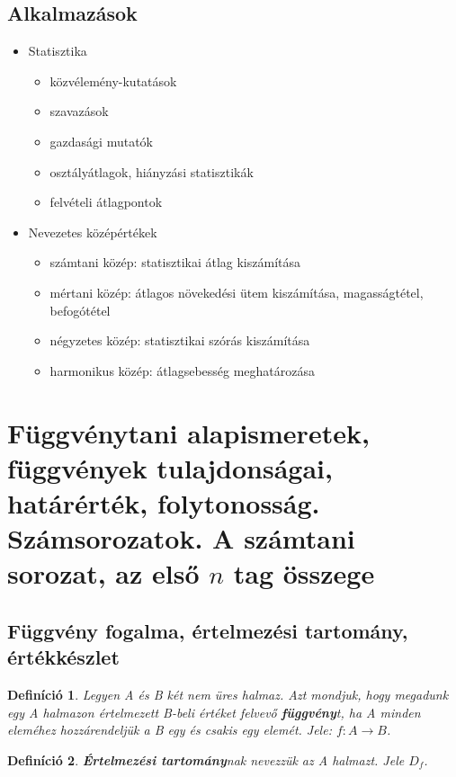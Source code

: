 \documentclass[12pt,a4paper]{article}
\newtheorem{definition}{Definíció} [section]
\begin{document}
\subsection{Alkalmazások}
\begin{itemize}
\item Statisztika
\begin{itemize}
\item közvélemény-kutatások
\item szavazások
\item gazdasági mutatók
\item osztályátlagok, hiányzási statisztikák
\item felvételi átlagpontok
\end{itemize}
\item Nevezetes középértékek
\begin{itemize}
\item számtani közép: statisztikai átlag kiszámítása
\item mértani közép: átlagos növekedési ütem kiszámítása, magasságtétel, befogótétel
\item négyzetes közép: statisztikai szórás kiszámítása
\item harmonikus közép: átlagsebesség meghatározása
\end{itemize}
\end{itemize}
\newpage





\section{Függvénytani alapismeretek, függvények tulajdonságai, határérték, folytonosság. Számsorozatok. A számtani sorozat, az első $n$ tag összege}
\subsection{Függvény fogalma, értelmezési tartomány, értékkészlet}

\begin{definition}
Legyen A és B két nem üres halmaz. Azt mondjuk, hogy megadunk egy A halmazon értelmezett B-beli értéket felvevő \textbf{függvény}t, ha A minden eleméhez hozzárendeljük a B egy és csakis egy elemét. Jele: $f: A \rightarrow B$.
\end{definition}

\begin{definition}
\textbf{Értelmezési tartomány}nak nevezzük az A halmazt. Jele $D_f$.
\end{definition}
\end{document}
